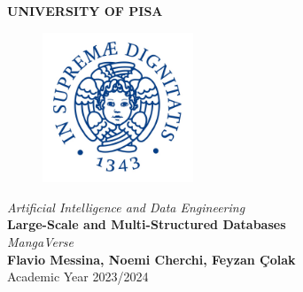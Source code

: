 \begin{titlepage}
    \centering
    \vspace*{\fill}
    {\LARGE \textbf{UNIVERSITY OF PISA}}\\[0.5cm]
    \begin{figure}[h]
        \centering
        \includegraphics[width=0.4\textwidth]{Media/university-of-Pisa-logo.jpg} 
    \end{figure}
    {\Large \textit{Artificial Intelligence and Data Engineering}}\\[1.5cm]
    {\LARGE \textbf{Large-Scale and Multi-Structured Databases}}\\[1cm]
    {\Large \textit{MangaVerse}}\\[8cm]
    {\large \textbf{Flavio Messina, Noemi Cherchi, Feyzan Çolak}}\\[0.5cm]
    {\large Academic Year 2023/2024}
    \vspace*{\fill}
\end{titlepage}